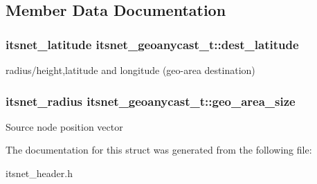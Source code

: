 \subsection{\-Member \-Data \-Documentation}
\hypertarget{structitsnet__geoanycast__t_a1d22addaee213ee88bb1e63aadb60cd4}{
\subsubsection[{dest\-\_\-latitude}]{\setlength{\rightskip}{0pt plus 5cm}itsnet\-\_\-latitude {\bf itsnet\-\_\-geoanycast\-\_\-t\-::dest\-\_\-latitude}}}\label{structitsnet__geoanycast__t_a1d22addaee213ee88bb1e63aadb60cd4}
radius/height,latitude and longitude (geo-\/area destination) \hypertarget{structitsnet__geoanycast__t_a65c993d970c76b01d436b3a5e797616f}{
\subsubsection[{geo\-\_\-area\-\_\-size}]{\setlength{\rightskip}{0pt plus 5cm}itsnet\-\_\-radius {\bf itsnet\-\_\-geoanycast\-\_\-t\-::geo\-\_\-area\-\_\-size}}}\label{structitsnet__geoanycast__t_a65c993d970c76b01d436b3a5e797616f}
\-Source node position vector 

\-The documentation for this struct was generated from the following file\-:\begin{DoxyCompactItemize}
\item 
itsnet\-\_\-header.\-h\end{DoxyCompactItemize}
